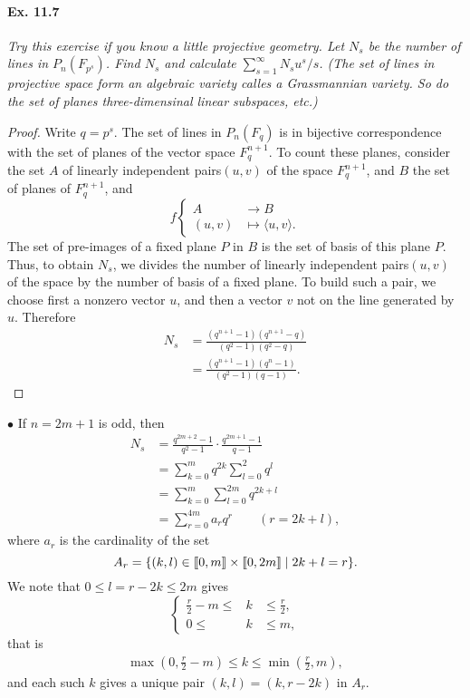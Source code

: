 \documentclass[11pt,a4paper]{article}
\def\gcro{\mbox{[\hspace{-.15em}[}}%
\def\dcro{\mbox{]\hspace{-.15em}]}}
\begin{document}
\paragraph{Ex. 11.7}{\it Try this exercise if you know a little projective geometry. Let $N_s$ be the number of lines in $P_n(F_{p^s})$. Find $N_s$ and calculate $\sum_{s=1}^\infty N_su^s/s$. (The set of lines in projective space form an algebraic variety calles a Grassmannian variety. So do the set of planes three-dimensinal linear subspaces, etc.)
}
\begin{proof}
Write $q = p^s$. The set of lines in $P_n(F_{q})$ is in bijective correspondence with the set of planes of the vector space $F_q^{n+1}$. To count these planes, consider the set $A$ of  linearly independent pairs$(u,v)$ of the space $F_q^{n+1}$, and $B$ the set of planes of $F_q^{n+1}$, and
$$
f 
\left\{
\begin{array}{ccl}
A & \to B \\
(u,v) & \mapsto \langle u, v \rangle.
\end{array}
\right.
$$
 The set of pre-images of a fixed plane $P$ in $B$ is the set of basis of this plane $P$. Thus, to obtain $N_s$, we divides the number of linearly independent pairs$(u,v)$ of the space by the number of basis of a fixed plane. To build such a pair, we choose first a nonzero vector $u$, and then a vector $v$ not on the line generated by $u$. Therefore
\begin{align*}
N_s &= \frac{(q^{n+1} - 1)(q^{n+1}- q)}{(q^2 - 1)(q^2 -q)}\\
&= \frac{(q^{n+1} - 1)(q^{n}- 1)}{(q^2 - 1)(q -1)}.
\end{align*}
\end{proof}

$\bullet$ If $n = 2m+1$ is odd, then
\begin{align*}
N_s &= \frac{q^{2m+2}-1}{q^2-1} \cdot \frac{q^{2m+1}-1}{q-1}\\
&=\sum_{k=0}^m q^{2k} \sum_{l = 0}^2 q^l\\
&=\sum_{k=0}^m \sum_{l = 0} ^{2m} q^{2k+l}\\
&=\sum_{r=0}^{4m} a_r q^r \qquad (r= 2k+l),
\end{align*}
where $a_r$ is the cardinality of the set
$$A_r = \{(k,l) \in \gcro 0, m \dcro \times \gcro 0, 2m \dcro \mid 2k+l = r\}.$$
We note that $0 \leq l = r-2k \leq 2m$ gives 
$$
\left\{
\begin{array}{rcl}
\frac{r}{2} - m \leq &k& \leq \frac{r}{2},\\
0 \leq &k& \leq m,
\end{array}
\right.
$$
that is
\begin{align}
\max\left( 0,  \frac{r}{2}  - m \right) \leq k \leq \min \left(\frac{r}{2} ,m \right),
\end{align}
 and each such $k$ gives a unique pair $(k,l) = (k,r-2k)$ in $A_r$.
\end{document}
